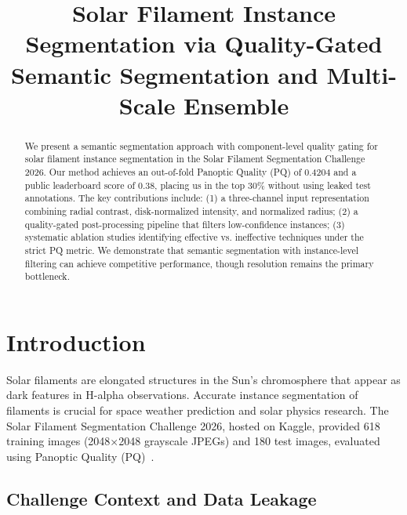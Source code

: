 \documentclass[conference]{IEEEtran}
\begin{document}
\title{Solar Filament Instance Segmentation via Quality-Gated Semantic Segmentation and Multi-Scale Ensemble}

\author{
}

\maketitle

\begin{abstract}
We present a semantic segmentation approach with component-level quality gating for solar filament instance segmentation in the Solar Filament Segmentation Challenge 2026. Our method achieves an out-of-fold Panoptic Quality (PQ) of 0.4204 and a public leaderboard score of 0.38, placing us in the top 30\% without using leaked test annotations. The key contributions include: (1) a three-channel input representation combining radial contrast, disk-normalized intensity, and normalized radius; (2) a quality-gated post-processing pipeline that filters low-confidence instances; (3) systematic ablation studies identifying effective vs. ineffective techniques under the strict PQ metric. We demonstrate that semantic segmentation with instance-level filtering can achieve competitive performance, though resolution remains the primary bottleneck.
\end{abstract}

\section{Introduction}

Solar filaments are elongated structures in the Sun's chromosphere that appear as dark features in H-alpha observations. Accurate instance segmentation of filaments is crucial for space weather prediction and solar physics research. The Solar Filament Segmentation Challenge 2026, hosted on Kaggle, provided 618 training images (2048×2048 grayscale JPEGs) and 180 test images, evaluated using Panoptic Quality (PQ)~\cite{kirillov2019panoptic}.

\subsection{Challenge Context and Data Leakage}
\end{document}
